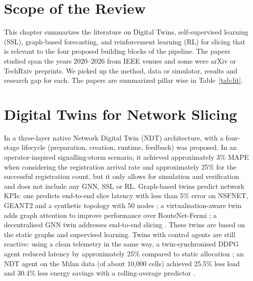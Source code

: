 \label{chap.2}

\section{Scope of the Review}
This chapter summarizes the literature on Digital Twins, self-supervised learning (SSL), graph-based forecasting, and reinforcement learning (RL) for slicing that is relevant to the four proposed building blocks of the pipeline. The papers studied span the years 2020–2026 from IEEE venues and some were arXiv or TechRxiv preprints. We picked up the method, data or simulator, results and research gap for each. The papers are summarized pillar wise in Table~\ref{tab:lit}.

\section{Digital Twins for Network Slicing}
In \cite{nativendt2025} a three-layer native Network Digital Twin (NDT) architecture, with a four-stage lifecycle (preparation, creation, runtime, feedback) was proposed. In an operator-inspired signalling-storm scenario, it achieved approximately 3\% MAPE when considering the registration arrival rate and approximately 25\% for the successful registration count, but it only allows for simulation and verification and does not include any GNN, SSL or RL. Graph-based twins predict network KPIs: one predicts end-to-end slice latency with less than 5\% error on NSFNET, GEANT2 and a synthetic topology with 50 nodes \cite{gnndt2022}; a virtualisation-aware twin adds graph attention to improve performance over RouteNet-Fermi \cite{attentionvirt2025}; a decentralised GNN twin addresses end-to-end slicing \cite{dte2e2023}. These twins are based on the static graphs and supervised learning. Twins with control agents are still reactive: using a clean telemetry in the same way, a twin-synchronised DDPG agent reduced latency by approximately 25\% compared to static allocation \cite{ali2025}; an NDT agent on the Milan data (of about 10,000 cells) achieved 25.5\% less load and 30.4\% less energy savings with a rolling-average predictor \cite{selfopt2026}.

